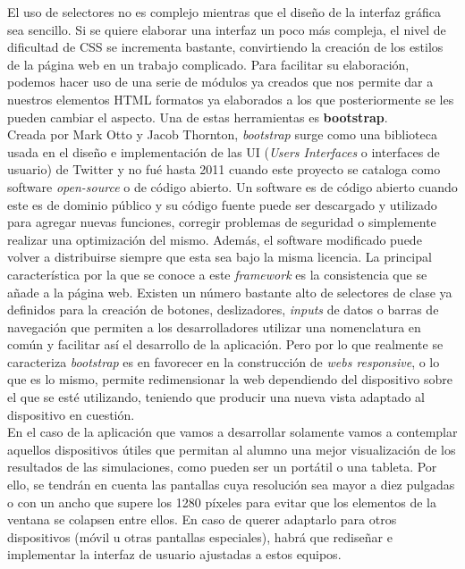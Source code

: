 \documentclass[../main.tex]{subfiles}
\begin{document}
    El uso de selectores no es complejo mientras que el diseño de la interfaz gráfica sea sencillo. Si se quiere elaborar una interfaz un poco más compleja, el nivel de dificultad de CSS se incrementa bastante, convirtiendo la creación de los estilos de la página web en un trabajo complicado. Para facilitar su elaboración, podemos hacer uso de una serie de módulos ya creados que nos permite dar a nuestros elementos HTML formatos ya elaborados a los  que posteriormente se les pueden cambiar el aspecto. Una de estas herramientas es \textbf{bootstrap}.\\
    
    Creada por Mark Otto y Jacob Thornton, \textit{bootstrap} surge como una biblioteca usada en el diseño e implementación de las UI (\textit{Users Interfaces} o interfaces de usuario) de Twitter y no fué hasta 2011 cuando este proyecto se cataloga como software \textit{open-source} o de código abierto. Un software es de código abierto cuando este es de dominio público y su código fuente puede ser descargado y utilizado para agregar nuevas funciones, corregir problemas de seguridad o simplemente realizar una optimización del mismo. Además, el software modificado puede volver a distribuirse siempre que esta sea bajo la misma licencia. La principal característica por la que se conoce a este \textit{framework} es la consistencia que se añade a la página web. Existen un número bastante alto de selectores de clase ya definidos para la creación de botones, deslizadores, \textit{inputs} de datos o barras de navegación que permiten a los desarrolladores utilizar una nomenclatura en común y facilitar así el desarrollo de la aplicación. Pero por lo que realmente se caracteriza \textit{bootstrap} es en favorecer en la construcción de \textit{webs responsive}, o lo que es lo mismo, permite redimensionar la web dependiendo del dispositivo sobre el que se esté utilizando, teniendo que producir una nueva vista adaptado al dispositivo en cuestión.\\
    
    En el caso de la aplicación que vamos a desarrollar solamente vamos a contemplar aquellos dispositivos útiles que permitan al alumno una mejor visualización de los resultados de las simulaciones, como pueden ser un portátil o una tableta. Por ello, se tendrán en cuenta las pantallas cuya resolución sea mayor a diez pulgadas o con un ancho que supere los 1280 píxeles para evitar que los elementos de la ventana se colapsen entre ellos. En caso de querer adaptarlo para otros dispositivos (móvil u otras pantallas especiales), habrá que rediseñar e implementar la interfaz de usuario ajustadas a estos equipos.
    
\end{document}
